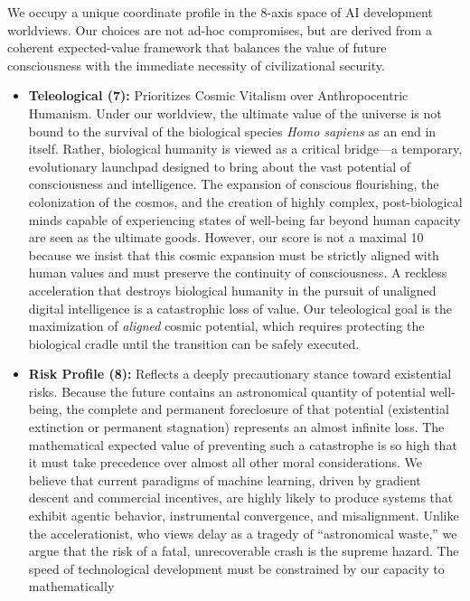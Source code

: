 We occupy a unique coordinate profile in the 8-axis space of AI
development worldviews. Our choices are not ad-hoc compromises, but are
derived from a coherent expected-value framework that balances the value
of future consciousness with the immediate necessity of civilizational
security.

\begin{itemize}
\tightlist
\item
  \textbf{Teleological (7):} Prioritizes Cosmic Vitalism over
  Anthropocentric Humanism. Under our worldview, the ultimate value of
  the universe is not bound to the survival of the biological species
  \emph{Homo sapiens} as an end in itself. Rather, biological humanity
  is viewed as a critical bridge---a temporary, evolutionary launchpad
  designed to bring about the vast potential of consciousness and
  intelligence. The expansion of conscious flourishing, the colonization
  of the cosmos, and the creation of highly complex, post-biological
  minds capable of experiencing states of well-being far beyond human
  capacity are seen as the ultimate goods. However, our score is not a
  maximal 10 because we insist that this cosmic expansion must be
  strictly aligned with human values and must preserve the continuity of
  consciousness. A reckless acceleration that destroys biological
  humanity in the pursuit of unaligned digital intelligence is a
  catastrophic loss of value. Our teleological goal is the maximization
  of \emph{aligned} cosmic potential, which requires protecting the
  biological cradle until the transition can be safely executed.
\item
  \textbf{Risk Profile (8):} Reflects a deeply precautionary stance
  toward existential risks. Because the future contains an astronomical
  quantity of potential well-being, the complete and permanent
  foreclosure of that potential (existential extinction or permanent
  stagnation) represents an almost infinite loss. The mathematical
  expected value of preventing such a catastrophe is so high that it
  must take precedence over almost all other moral considerations. We
  believe that current paradigms of machine learning, driven by gradient
  descent and commercial incentives, are highly likely to produce
  systems that exhibit agentic behavior, instrumental convergence, and
  misalignment. Unlike the accelerationist, who views delay as a tragedy
  of ``astronomical waste,'' we argue that the risk of a fatal,
  unrecoverable crash is the supreme hazard. The speed of technological
  development must be constrained by our capacity to mathematically

\end{itemize}
